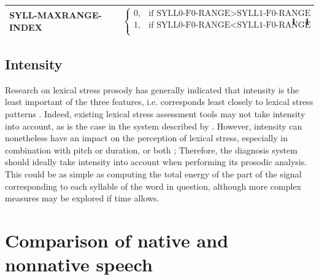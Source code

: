 \begin{table}[htb]
{\begin{tabularx}{\textwidth}{p{}Xrr}
		SYLL-MAXRANGE-INDEX	
					& $\begin{cases} 
								0, & \text{if SYLL0-F0-RANGE}>\text{SYLL1-F0-RANGE}\\
								1, & \text{if SYLL0-F0-RANGE}<\text{SYLL1-F0-RANGE}\\
							\end{cases}$
																									& 1					& 1				\\
		\bottomrule
		\end{tabularx}
		} %
		\label{tab:durationfeatures}
\end{table}


	\subsection{Intensity}
	\label{sec:prosody:intensity}
	
	
		Research on lexical stress prosody has generally indicated that intensity is the least important of the three features, i.e. corresponds least closely to lexical stress patterns \citep{Cutler2005}. 
Indeed, existing lexical stress assessment tools may not take intensity into account, as is the case in the system described by \textcite{Bonneau2011}.  However, intensity can nonetheless have an impact on the perception of lexical stress, especially in combination with pitch or duration, or both \citep{Cutler2005}; %
Therefore, the diagnosis system should ideally take intensity into account when performing its prosodic analysis. This could be as simple as computing the total energy of the part of the signal corresponding to each syllable of the word in question, although more complex measures may be explored if time allows.
	
\section{Comparison of native and nonnative speech}
\label{sec:diag:compare}

